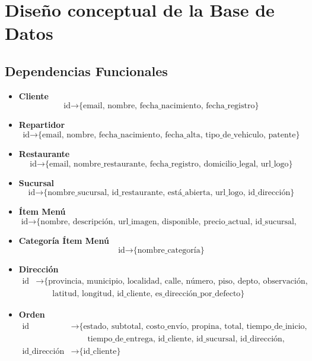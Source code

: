 \section{Diseño conceptual de la Base de Datos}

\subsection{Dependencias Funcionales}

\begin{itemize}
    \item \textbf{Cliente}
    \[\text{id} \rightarrow \text{\{email, nombre, fecha\_nacimiento, fecha\_registro\}}\]
    
    \item \textbf{Repartidor}
    \[\text{id} \rightarrow \text{\{email, nombre, fecha\_nacimiento, fecha\_alta, tipo\_de\_vehiculo, patente\}}\]
    
    \item \textbf{Restaurante}
    \[\text{id} \rightarrow \text{\{email, nombre\_restaurante, fecha\_registro, domicilio\_legal, url\_logo\}}\]

    \item \textbf{Sucursal}
    \[\text{id} \rightarrow \text{\{nombre\_sucursal, id\_restaurante, está\_abierta, url\_logo, id\_dirección\}}\]
    
    \item \textbf{Ítem Menú}
    \[\text{id} \rightarrow \text{\{nombre, descripción, url\_imagen, disponible, precio\_actual, id\_sucursal, id\_categoría\}}\]
    
    \item \textbf{Categoría Ítem Menú}
    \[\text{id} \rightarrow \text{\{nombre\_categoría\}}\]

    \item \textbf{Dirección}
    \begin{align*}
        \text{id} &\rightarrow \text{\{provincia, municipio, localidad, calle, número, piso, depto, observación, tel,} \\
        &\qquad \text{latitud, longitud, id\_cliente, es\_dirección\_por\_defecto\}}
    \end{align*}
    
    \item \textbf{Orden}
    \begin{align*}
        \text{id} &\rightarrow \text{\{estado, subtotal, costo\_envío, propina, total, tiempo\_de\_inicio,} \\
        &\qquad \text{tiempo\_de\_entrega, id\_cliente, id\_sucursal, id\_dirección, id\_repartidor\}} \\
        \text{id\_dirección} &\rightarrow \text{\{id\_cliente\}}
    \end{align*}


\end{itemize}
